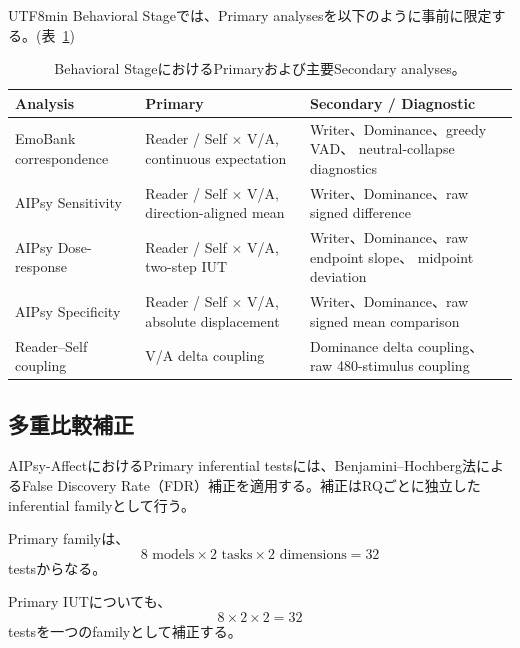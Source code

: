 \documentclass{article} %
\begin{document}
\begin{CJK*}{UTF8}{min}
Behavioral Stageでは、Primary analysesを以下のように事前に限定する。(表~\ref{tab:behavioral-primary-secondary})

\begin{table}[htbp]
\centering
\small
\caption{Behavioral StageにおけるPrimaryおよび主要Secondary analyses。}
\label{tab:behavioral-primary-secondary}
\begin{tabularx}{\linewidth}{
@{}
>{\raggedright\arraybackslash}p{2.2cm}
>{\raggedright\arraybackslash}p{3.3cm}
>{\raggedright\arraybackslash}X
@{}
}
\toprule
\textbf{Analysis} &
\textbf{Primary} &
\textbf{Secondary / Diagnostic} \\
\midrule
EmoBank correspondence &
Reader / Self $\times$ V/A,
continuous expectation &
Writer、Dominance、greedy VAD、
neutral-collapse diagnostics \\

AIPsy Sensitivity &
Reader / Self $\times$ V/A,
direction-aligned mean &
Writer、Dominance、raw signed difference \\

AIPsy Dose-response &
Reader / Self $\times$ V/A,
two-step IUT &
Writer、Dominance、raw endpoint slope、
midpoint deviation \\

AIPsy Specificity &
Reader / Self $\times$ V/A,
absolute displacement &
Writer、Dominance、raw signed mean comparison \\

Reader--Self coupling &
V/A delta coupling &
Dominance delta coupling、
raw 480-stimulus coupling \\
\bottomrule
\end{tabularx}
\end{table}


\subsection{多重比較補正}
\label{app:behavioral-fdr}

AIPsy-AffectにおけるPrimary inferential testsには、Benjamini--Hochberg法によるFalse Discovery Rate（FDR）補正を適用する\citep{benjamini1995controlling}。補正はRQごとに独立したinferential familyとして行う。

Primary familyは、
\[
8\text{ models}
\times
2\text{ tasks}
\times
2\text{ dimensions}
=
32
\]
testsからなる。

Primary IUTについても、
\[
8
\times
2
\times
2
=
32
\]
testsを一つのfamilyとして補正する。


\end{CJK*}
\end{document}
